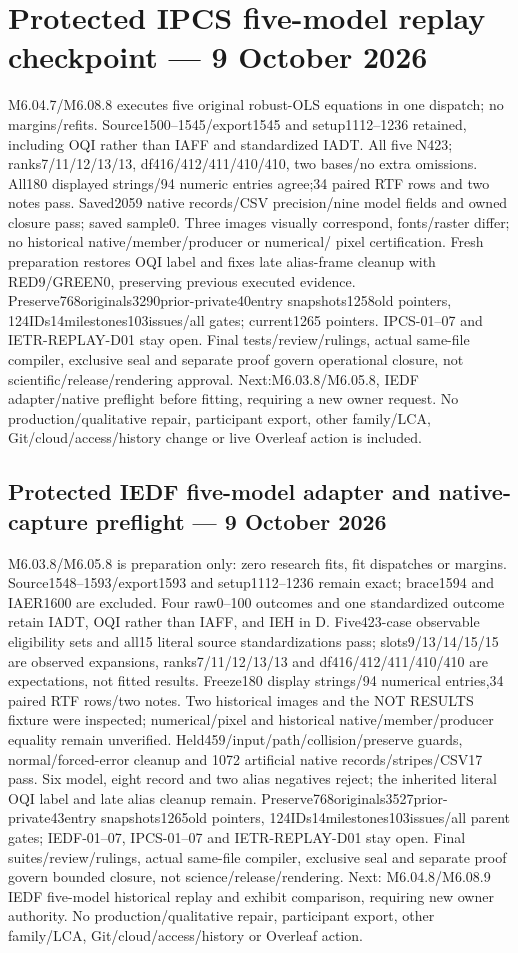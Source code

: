 \documentclass[11pt,a4paper]{article}
\begin{document}
\section*{Protected IPCS five-model replay checkpoint --- 9 October 2026}
M6.04.7/M6.08.8 executes five original robust-OLS equations in one dispatch;
no margins/refits. Source1500--1545/export1545 and setup1112--1236 retained,
including OQI rather than IAFF and standardized IADT. All five N423;
ranks7/11/12/13/13, df416/412/411/410/410, two bases/no extra omissions.
All180 displayed strings/94 numeric entries agree;34 paired RTF rows and
two notes pass. Saved2059 native records/CSV precision/nine model fields
and owned closure pass; saved sample0. Three images visually correspond,
fonts/raster differ; no historical native/member/producer or numerical/
pixel certification. Fresh preparation restores OQI label and fixes late
alias-frame cleanup with RED9/GREEN0, preserving previous executed evidence.
Preserve768originals3290prior-private40entry snapshots1258old pointers,
124IDs14milestones103issues/all gates; current1265 pointers. IPCS-01--07
and IETR-REPLAY-D01 stay open. Final tests/review/rulings, actual same-file
compiler, exclusive seal and separate proof govern operational closure,
not scientific/release/rendering approval. Next:M6.03.8/M6.05.8,
IEDF adapter/native preflight before fitting, requiring a new owner request.
No production/qualitative repair, participant export, other family/LCA,
Git/cloud/access/history change or live Overleaf action is included.


\subsection*{Protected IEDF five-model adapter and native-capture preflight --- 9 October 2026}
M6.03.8/M6.05.8 is preparation only: zero research fits, fit dispatches or margins.
Source1548--1593/export1593 and setup1112--1236 remain exact; brace1594 and IAER1600
are excluded. Four raw0--100 outcomes and one standardized outcome retain IADT,
OQI rather than IAFF, and IEH in D. Five423-case observable eligibility sets and all15
literal source standardizations pass; slots9/13/14/15/15 are observed expansions,
ranks7/11/12/13/13 and df416/412/411/410/410 are expectations, not fitted results.
Freeze180 display strings/94 numerical entries,34 paired RTF rows/two notes.
Two historical images and the NOT RESULTS fixture were inspected; numerical/pixel
and historical native/member/producer equality remain unverified.
Held459/input/path/collision/preserve guards, normal/forced-error cleanup and
1072 artificial native records/stripes/CSV17 pass. Six model, eight record and two
alias negatives reject; the inherited literal OQI label and late alias cleanup remain.
Preserve768originals3527prior-private43entry snapshots1265old pointers,
124IDs14milestones103issues/all parent gates; IEDF-01--07, IPCS-01--07 and
IETR-REPLAY-D01 stay open. Final suites/review/rulings, actual same-file compiler,
exclusive seal and separate proof govern bounded closure, not science/release/rendering.
Next: M6.04.8/M6.08.9 IEDF five-model historical replay and exhibit comparison,
requiring new owner authority. No production/qualitative repair, participant export,
other family/LCA, Git/cloud/access/history or Overleaf action.
\end{document}
